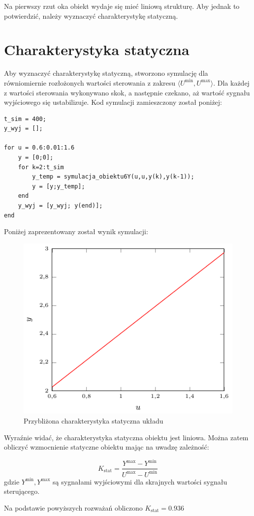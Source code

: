 \par Na pierwszy rzut oka obiekt wydaje się mieć liniową strukturę. Aby jednak to potwierdzić, należy wyznaczyć charakterystykę statyczną.


\section{Charakterystyka statyczna}
Aby wyznaczyć charakterystykę statyczną, stworzono symulację dla równiomiernie rozłożonych wartości sterowania z zakresu $ \langle  U^{\textrm{min}}, U^{\textrm{max}}\rangle $. Dla każdej z wartości sterowania wykonywano skok, a następnie czekano, aż wartość sygnału wyjściowego się ustabilizuje. Kod symulacji zamieszczony został poniżej:

\begin{lstlisting}[style=Matlab-editor]
t_sim = 400;
y_wyj = [];

for u = 0.6:0.01:1.6
    y = [0;0];
    for k=2:t_sim
        y_temp = symulacja_obiektu6Y(u,u,y(k),y(k-1));
        y = [y;y_temp];
    end
    y_wyj = [y_wyj; y(end)];
end
\end{lstlisting}
Poniżej zaprezentowany został wynik symulacji:
\begin{figure}[tb] 
\centering 
\includegraphics[scale=1.4]{wykresy/zad1_2/char_stat.pdf} 
\caption{Przybliżona charakterystyka statyczna układu} 
\end{figure}
Wyraźnie widać, że charakterystyka statyczna obiektu jest liniowa. Można zatem obliczyć wzmocnienie statyczne obiektu mając na uwadzę zależność:

\begin{equation}
K_{\textrm{stat}} = \frac{Y^{\textrm{max}} - Y^{\textrm{min}}}{U^{\textrm{max}} - U^{\textrm{min}}}
\end{equation}
gdzie $Y^{\textrm{min}}, Y^{\textrm{max}}$ są sygnałami wyjściowymi dla skrajnych wartości sygnału sterującego.
\par Na podstawie powyższych rozważań obliczono $K_{\textrm{stat}} = \num{0.936}$



